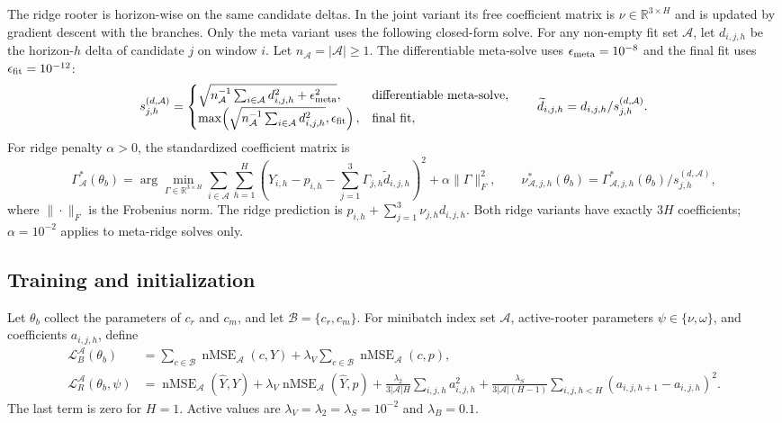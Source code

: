 \documentclass[10pt]{article}
\newcommand{\reals}{\mathbb{R}}
\newcommand{\nMSE}{\operatorname{nMSE}}
\begin{document}
The ridge rooter is horizon-wise on the same candidate deltas. In the joint
variant its free coefficient matrix is $\nu\in\reals^{3\times H}$ and is updated
by gradient descent with the branches. Only the meta variant uses the following
closed-form solve.
For any non-empty fit set $\mathcal A$, let
$d_{i,j,h}$ be the horizon-$h$ delta of candidate $j$ on window $i$. Let
$n_{\mathcal A}=|\mathcal A|\geq1$. The differentiable meta-solve uses
$\epsilon_{\rm meta}=10^{-8}$ and the final fit uses
$\epsilon_{\rm fit}=10^{-12}$:
\[
 s_{j,h}^{(d,\mathcal A)}=
 \begin{cases}
  \sqrt{n_{\mathcal A}^{-1}\sum_{i\in\mathcal A}d_{i,j,h}^2
   +\epsilon_{\rm meta}^2},&\text{differentiable meta-solve},\\
  \max\!\left(\sqrt{n_{\mathcal A}^{-1}\sum_{i\in\mathcal A}d_{i,j,h}^2},
   \epsilon_{\rm fit}\right),&\text{final fit},
 \end{cases}
 \qquad \widetilde d_{i,j,h}=d_{i,j,h}/s_{j,h}^{(d,\mathcal A)}.
\]
For ridge penalty $\alpha>0$, the standardized coefficient matrix is
\[
 \Gamma^*_{\mathcal A}(\theta_b)=\arg\min_{\Gamma\in\reals^{3\times H}}
 \sum_{i\in\mathcal A}\sum_{h=1}^H
 \left(Y_{i,h}-p_{i,h}
  -\sum_{j=1}^{3}\Gamma_{j,h}\widetilde d_{i,j,h}\right)^2
 +\alpha\|\Gamma\|_F^2,
 \qquad \nu^*_{\mathcal A,j,h}(\theta_b)
 =\Gamma^*_{\mathcal A,j,h}(\theta_b)/s_{j,h}^{(d,\mathcal A)},
\]
where $\|\cdot\|_F$ is the Frobenius norm. The ridge prediction is
$p_{i,h}+\sum_{j=1}^{3}\nu_{j,h}d_{i,j,h}$. Both ridge variants have exactly
$3H$ coefficients; $\alpha=10^{-2}$ applies to meta-ridge solves only.

\subsection{Training and initialization}

Let $\theta_b$ collect the parameters of $c_r$ and $c_m$, and let
$\mathcal B=\{c_r,c_m\}$. For minibatch index set $\mathcal A$, active-rooter
parameters $\psi\in\{\nu,\omega\}$, and coefficients $a_{i,j,h}$, define
\begin{align}
 \mathcal L_B^{\mathcal A}(\theta_b)
 &=\sum_{c\in\mathcal B}\nMSE_{\mathcal A}(c,Y)
 +\lambda_V\sum_{c\in\mathcal B}\nMSE_{\mathcal A}(c,p),\\
 \mathcal L_R^{\mathcal A}(\theta_b,\psi)
 &=\nMSE_{\mathcal A}(\widehat Y,Y)+\lambda_V\nMSE_{\mathcal A}(\widehat Y,p)
 +\frac{\lambda_2}{3|\mathcal A|H}\sum_{i,j,h}a_{i,j,h}^2
 +\frac{\lambda_S}{3|\mathcal A|(H-1)}\sum_{i,j,h<H}
 (a_{i,j,h+1}-a_{i,j,h})^2.
\end{align}
The last term is zero for $H=1$. Active values are
$\lambda_V=\lambda_2=\lambda_S=10^{-2}$ and $\lambda_B=0.1$.
\end{document}
